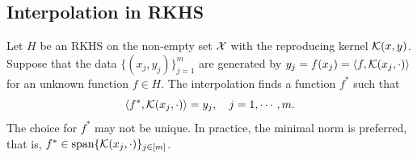 \subsection{Interpolation in RKHS}
\label{SSec: 2-Int-RKH}
Let $H$ be an RKHS on the non-empty set $\mathcal X$ with the reproducing kernel $\mathcal K(x, y)$. Suppose that the data $\{(x_j, y_j)\}_{j=1}^m$ are generated by $  y_j = f(x_j) = \langle {f, \mathcal K(x_j,\cdot)} \rangle $ for an unknown function $f\in H$. The interpolation finds a function $f^{\ast}$ such that 
\begin{equation}
    \langle {f^{\ast}, \mathcal K(x_j,\cdot)} \rangle = y_j,\quad j=1,\cdots, m.
\end{equation}
The choice for $f^{\ast}$ may not be unique. In practice, the minimal norm is preferred, that is, $f^{\ast}\in \textrm{span}\{ \mathcal K(x_j,\cdot)\}_{j\in[m]}$.   

